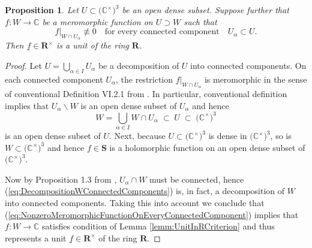 \documentclass{amsart}
\newtheorem{proposition}[theorem]{Proposition}
\begin{document}
\begin{proposition}
    Let $U\subset\big(\mathbb C^\times\big)^3$ be an open dense subset. Suppose further that $f:W\rightarrow\mathbb C$ be a meromorphic function on $U\supset W$ such that
    \begin{equation}
    f\big|_{W\cap U_\alpha}\not\equiv0\quad\textrm{for every connected component}\quad U_\alpha\subset U.
    \label{eq:NonzeroMeromorphicFunctionOnEveryConnectedComponent}
    \end{equation}
    Then $\underline f\in\mathbf R^\times$ is a unit of the ring $\mathbf R$.
\label{prop:MeromorphicFunctionIsAUnitCriterion}
\end{proposition}
\begin{proof}
Let $U=\bigcup_{\alpha\in I}U_\alpha$ be a decomposition of $U$ into connected components. On each connected component $U_\alpha$, the restriction $f|_{W\cap U_\alpha}$ is meromorphic in the sense of conventional Definition VI.2.1 from \cite{FischerLieb'2012}. In particular, conventional definition implies that $U_\alpha\backslash W$ is an open dense subset of $U_\alpha$ and hence
\begin{equation}
W=\bigcup_{\alpha\in I}W\cap U_\alpha\;\subset\; U\;\subset\;\big(\mathbb C^\times\big)^3
\label{eq:DecompositionWConnectedComponents}
\end{equation}
is an open dense subset of $U$. Next, because $U\subset\big(\mathbb C^\times\big)^3$ is dense in $\big(\mathbb C^\times\big)^3$, so is $W\subset\big(\mathbb C^\times\big)^3$ and hence $f\in\mathbf S$ is a holomorphic function on an open dense subset of $\big(\mathbb C^\times\big)^3$.

Now by Proposition 1.3 from \cite{FischerLieb'2012}, $U_{\alpha}\cap W$ must be connected, hence (\ref{eq:DecompositionWConnectedComponents}) is, in fact, a decomposition of $W$ into connected components. Taking this into account we conclude that (\ref{eq:NonzeroMeromorphicFunctionOnEveryConnectedComponent}) implies that $f:W\rightarrow\mathbb C$ satisfies condition of Lemma \ref{lemm:UnitInRCriterion} and thus represents a unit $\underline f\in\mathbf R^\times$ of the ring $\mathbf R$.
\end{proof}
\end{document}
